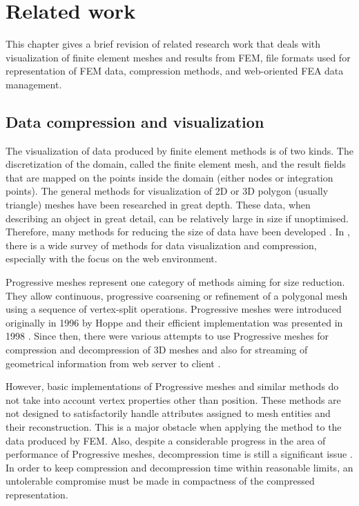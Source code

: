 \chapter{Related work}
\label{chapter:related-work}


This chapter gives a brief revision of related research work that deals with visualization of finite element meshes and results from FEM, file formats used for representation of FEM data, compression methods, and web-oriented FEA data management.


\section{Data compression and visualization}

The visualization of data produced by finite element methods is of two kinds. The discretization of the domain, called the finite element mesh, and the result fields that are mapped on the points inside the domain (either nodes or integration points). The general methods for visualization of 2D or 3D polygon (usually triangle) meshes have been researched in great depth. These data, when describing an object in great detail, can be relatively large in size if unoptimised. Therefore, many methods for reducing the size of data have been developed \cite{Alliez2005}. In \cite{Evans2014}, there is a wide survey of methods for data visualization and compression, especially with the focus on the web environment.

Progressive meshes represent one category of methods aiming for size reduction. They allow continuous, progressive coarsening or refinement of a polygonal mesh using a sequence of vertex-split operations. Progressive meshes were introduced originally in 1996 by Hoppe \cite{Hoppe1996} and their efficient implementation was presented in 1998 \cite{Hoppe1998}. Since then, there were various attempts to use Progressive meshes for compression and decompression of 3D meshes \cite{Gudukbay2002, Valette2004, Valette2009, Lavoue2013} and also for streaming of geometrical information from web server to client \cite{Alliez2001, Maglo2012}.

However, basic implementations of Progressive meshes and similar methods do not take into account vertex properties other than position. These methods are not designed to satisfactorily handle attributes assigned to mesh entities and their reconstruction. This is a major obstacle when applying the method to the data produced by FEM. Also, despite a considerable progress in the area of performance of Progressive meshes, decompression time is still a significant issue \cite{Limper2013}. In order to keep compression and decompression time within reasonable limits, an untolerable compromise must be made in compactness of the compressed representation.

